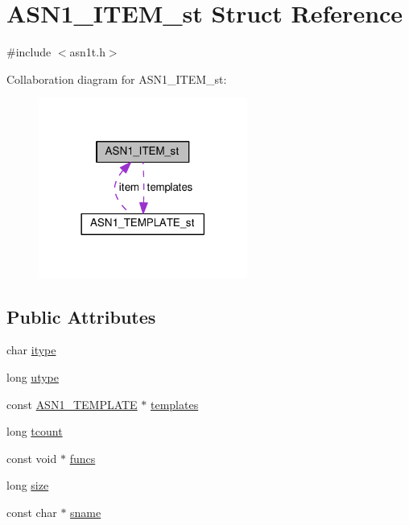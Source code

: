 \hypertarget{struct_a_s_n1___i_t_e_m__st}{}\section{A\+S\+N1\+\_\+\+I\+T\+E\+M\+\_\+st Struct Reference}
\label{struct_a_s_n1___i_t_e_m__st}


{\ttfamily \#include $<$asn1t.\+h$>$}



Collaboration diagram for A\+S\+N1\+\_\+\+I\+T\+E\+M\+\_\+st\+:
\nopagebreak
\begin{figure}[H]
\begin{center}
\leavevmode
\includegraphics[width=194pt]{struct_a_s_n1___i_t_e_m__st__coll__graph}
\end{center}
\end{figure}
\subsection*{Public Attributes}
\begin{DoxyCompactItemize}
\item 
char \hyperlink{struct_a_s_n1___i_t_e_m__st_a303cc31bacb86b92451cb5b389e57440}{itype}
\item 
long \hyperlink{struct_a_s_n1___i_t_e_m__st_a49602e67011b80d23622751f6ce154f5}{utype}
\item 
const \hyperlink{asn1_8h_a6c952ee1ae445fda1ca8e1761bbd93ac}{A\+S\+N1\+\_\+\+T\+E\+M\+P\+L\+A\+TE} $\ast$ \hyperlink{struct_a_s_n1___i_t_e_m__st_a63735dc5d18e7f66b3071f4ca76e8462}{templates}
\item 
long \hyperlink{struct_a_s_n1___i_t_e_m__st_a52bce8167464f68b77aeeabf7b8c26d9}{tcount}
\item 
const void $\ast$ \hyperlink{struct_a_s_n1___i_t_e_m__st_abb4e623222d55a9c7b203c9b29e5aefe}{funcs}
\item 
long \hyperlink{struct_a_s_n1___i_t_e_m__st_a5f11bb1968cd49b114d1459ecb9574d9}{size}
\item 
const char $\ast$ \hyperlink{struct_a_s_n1___i_t_e_m__st_a2375aeececad55dcefd782c78a661fe6}{sname}
\end{DoxyCompactItemize}



